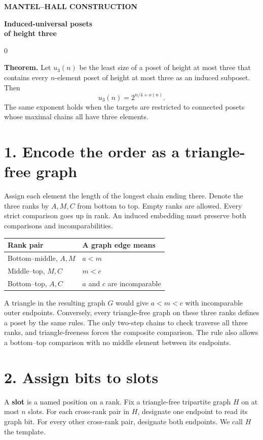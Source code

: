 \documentclass[11pt,a4paper]{article}
\newcommand{\PaperTitle}{%
  {\sffamily\footnotesize\bfseries\color{teal}MANTEL--HALL CONSTRUCTION\par}
  \vspace{6pt}
  {\sffamily\bfseries\fontsize{30}{32}\selectfont Induced-universal posets\\of height three\par}
  \vspace{12pt}}
\newenvironment{resultbox}{\par\begingroup\setlength{\fboxsep}{11pt}\noindent
  \begin{lrbox}{0}\begin{minipage}{\dimexpr\linewidth-2\fboxsep\relax}\setlength{\parskip}{4pt}}
  {\end{minipage}\end{lrbox}\colorbox{wash}{\usebox{0}}\par\endgroup\vspace{3pt}}
\begin{document}
\color{ink}
\PaperTitle

\begin{resultbox}

\textbf{Theorem.} Let \(u_3(n)\) be the least size of a poset of height
at most three that contains every \(n\)-element poset of height at most
three as an induced subposet. Then \[
u_3(n)=2^{n/4+o(n)}.
\] The same exponent holds when the targets are restricted to connected
posets whose maximal chains all have three elements.

\end{resultbox}

\section{1. Encode the order as a triangle-free
graph}\label{encode-the-order-as-a-triangle-free-graph}

Assign each element the length of the longest chain ending there. Denote
the three ranks by \(A,M,C\) from bottom to top. Empty ranks are
allowed. Every strict comparison goes up in rank. An induced embedding
must preserve both comparisons and incomparabilities.

\begin{longtable}[]{@{}ll@{}}
\toprule\noalign{}
Rank pair & A graph edge means \\
\midrule\noalign{}
\endhead
\bottomrule\noalign{}
\endlastfoot
Bottom--middle, \(A,M\) & \(a<m\) \\
Middle--top, \(M,C\) & \(m<c\) \\
Bottom--top, \(A,C\) & \(a\) and \(c\) are incomparable \\
\end{longtable}

A triangle in the resulting graph \(G\) would give \(a<m<c\) with
incomparable outer endpoints. Conversely, every triangle-free graph on
these three ranks defines a poset by the same rules. The only two-step
chains to check traverse all three ranks, and triangle-freeness forces
the composite comparison. The rule also allows a bottom--top comparison
with no middle element between its endpoints.

\section{2. Assign bits to slots}\label{assign-bits-to-slots}

A \textbf{slot} is a named position on a rank. Fix a triangle-free
tripartite graph \(H\) on at most \(n\) slots. For each cross-rank pair
in \(H\), designate one endpoint to read its graph bit. For every other
cross-rank pair, designate both endpoints. We call \(H\) the template.
\end{document}
